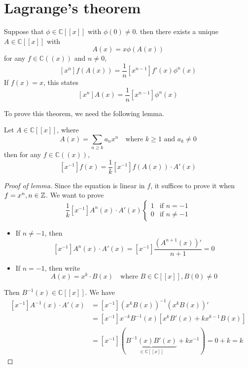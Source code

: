 \section{Lagrange's theorem}
\begin{theorem}
Suppose that \(\phi\in\mathbb{C}[[x]]\) with \(\phi(0)\neq0\).
then there exists a unique \(A\in\mathbb{C}[[x]]\) with
\[ A(x)=x\phi(A(x)) \]
for any \(f\in\mathbb{C}((x))\) and \(n\neq0\),
\[ \left[x^n\right]f(A(x))=\frac{1}{n}\left[x^{n-1}\right]f'(x)\phi^n(x) \]
If \(f(x)=x\), this states
\[ \left[x^n\right]A(x)=\frac{1}{n}\left[x^{n-1}\right]\phi^n(x) \]
\end{theorem}

To prove this theorem, we need the following lemma.
\begin{lemma}
\label{residuecomposition}
Let \(A\in\mathbb{C}[[x]]\), where
\[ A(x)=\sum_{n\geq k}a_n x^n \quad \text{where } k\geq1 \text{ and } a_k\neq0 \]
then for any \(f\in\mathbb{C}((x))\),
\[ \left[x^{-1}\right]f(x)=\frac{1}{k}\left[x^{-1}\right]f(A(x))\cdot A'(x) \]
\end{lemma}
\begin{proof}[Proof of lemma]
Since the equation is linear in \(f\), it suffices to prove it when \(f=x^n,n\in\mathbb{Z}\).
We want to prove
\[ \frac{1}{k}\left[x^{-1}\right]A^n(x)\cdot A'(x)\begin{cases} 1 & \text{if } n=-1 \\ 0 & \text{if } n\neq-1\end{cases} \]
\begin{itemize}
\item If \(n\neq-1\), then
\[ \left[x^{-1}\right]A^n(x)\cdot A'(x)=\left[x^{-1}\right]\frac{\left(A^{n+1}(x)\right)'}{n+1}=0 \]
\item If \(n=-1\), then write
\[ A(x)=x^k\cdot B(x) \quad \text{where } B\in\mathbb{C}[[x]], B(0)\neq0 \]
\end{itemize}
Then \(B^{-1}(x)\in\mathbb{C}[[x]]\).
We have
\begin{align*}
\left[x^{-1}\right]A^{-1}(x)\cdot A'(x)&=\left[x^{-1}\right]\left(x^kB(x)\right)^{-1}\left(x^kB(x)\right)'\\
&=\left[x^{-1}\right]x^{-k}B^{-1}(x)\left[x^kB'(x)+kx^{k-1}B(x)\right]\\
&=\left[x^{-1}\right](\underbrace{B^{-1}(x)B'(x)}_{\in\mathbb{C}[[x]]}+kx^{-1})=0+k=k
\end{align*}
\end{proof}

